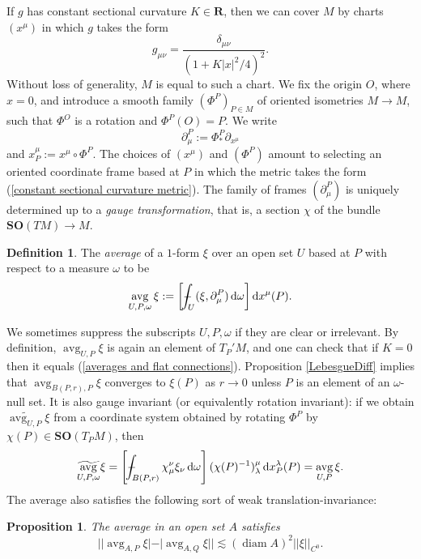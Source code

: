 \documentclass[reqno,11pt]{amsart}
\newcommand{\RR}{\mathbf{R}}
\newcommand{\SpOrth}{\mathbf{SO}}
\DeclareMathOperator{\avg}{avg}
\DeclareMathOperator{\diam}{diam}
\newcommand*\dif{\mathop{}\!\mathrm{d}}
\newcommand{\dfn}[1]{\emph{#1}\index{#1}}
\newtheorem{proposition}[theorem]{Proposition}
\theoremstyle{definition}
\newtheorem{definition}[theorem]{Definition}
\numberwithin{equation}{section}
\def\Xint#1{\mathchoice
{\XXint\displaystyle\textstyle{#1}}%
{\XXint\textstyle\scriptstyle{#1}}%
{\XXint\scriptstyle\scriptscriptstyle{#1}}%
{\XXint\scriptscriptstyle\scriptscriptstyle{#1}}%
\!\int}
\def\XXint#1#2#3{{\setbox0=\hbox{$#1{#2#3}{\int}$ }
\vcenter{\hbox{$#2#3$ }}\kern-.6\wd0}}
\def\dashint{\Xint-}
\begin{document}
If $g$ has constant sectional curvature $K \in \RR$, then we can cover $M$ by charts $(x^\mu)$ in which $g$ takes the form
\begin{equation}\label{constant sectional curvature metric}
g_{\mu\nu} = \frac{\delta_{\mu\nu}}{(1 + K|x|^2/4)^2}.
\end{equation}
Without loss of generality, $M$ is equal to such a chart.
We fix the origin $O$, where $x = 0$, and introduce a smooth family $(\Phi^P)_{P \in M}$ of oriented isometries $M \to M$, such that $\Phi^O$ is a rotation and $\Phi^P(O) = P$.
We write
$$\partial^P_\mu := \Phi^P_* \partial_{x^\mu}$$
and $x^\mu_P := x^\mu \circ \Phi^P$.
The choices of $(x^\mu)$ and $(\Phi^P)$ amount to selecting an oriented coordinate frame based at $P$ in which the metric takes the form (\ref{constant sectional curvature metric}).
The family of frames $(\partial^P_\mu)$ is uniquely determined up to a \dfn{gauge transformation}, that is, a section $\chi$ of the bundle $\SpOrth(TM) \to M$.

\begin{definition}
The \dfn{average} of a $1$-form $\xi$ over an open set $U$ based at $P$ with respect to a measure $\omega$ to be
$$\avg_{U, P, \omega} \xi := \left[\dashint_U (\xi, \partial^P_\mu) \dif \omega\right] \dif x^\mu(P).$$
\end{definition}

We sometimes suppress the subscripts $U, P, \omega$ if they are clear or irrelevant.
By definition, $\avg_{U, P} \xi$ is again an element of $T_P'M$, and one can check that if $K = 0$ then it equals (\ref{averages and flat connections}).
Proposition \ref{LebesgueDiff} implies that $\avg_{B(P, r), P} \xi$ converges to $\xi(P)$ as $r \to 0$ unless $P$ is an element of an $\omega$-null set.
It is also gauge invariant (or equivalently rotation invariant): if we obtain $\widetilde{\avg_{U, P}} \xi$ from a coordinate system obtained by rotating $\Phi^P$ by $\chi(P) \in \SpOrth(T_PM)$, then
$$\widetilde{\avg_{U, P, \omega}} \xi = \left[\dashint_{B(P, r)} \chi^\nu_\mu \xi_\nu \dif \omega\right] (\chi(P)^{-1})_\lambda^\mu \dif x^\lambda_P(P) = \avg_{U, P} \xi.$$
The average also satisfies the following sort of weak translation-invariance:

\begin{proposition}\label{translation invariance}
The average in an open set $A$ satisfies
$$||\avg_{A, P} \xi| - |\avg_{A, Q} \xi|| \lesssim (\diam A)^2 ||\xi||_{C^0}.$$
\end{proposition}
\end{document}
